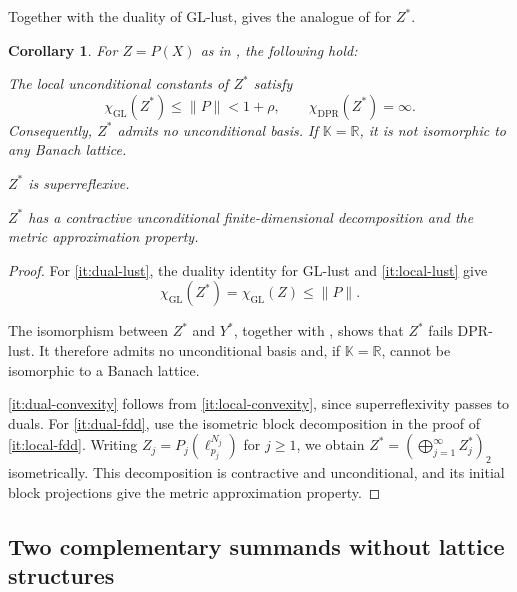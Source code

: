 \documentclass[11pt,a4paper,reqno]{amsart}
\newtheorem{corollary}[corollary]{Corollary}
\theoremstyle{definition}
\newcommand{\R}{\mathbb R}
\newcommand{\norm}[1]{\lVert #1\rVert}
\numberwithin{equation}{section}
\begin{document}
Together with the duality of GL-lust,  gives the analogue of  for $Z^*$.

\begin{corollary}\label{cor:dual-consequences}
For $Z=P(X)$ as in , the following hold:
\begin{resultparts}
\item\label{it:dual-lust}
The local unconditional constants of $Z^*$ satisfy
\begin{equation*}
 \chi_{\mathrm{GL}}(Z^*)\leq\norm P<1+\rho,
 \qquad \chi_{\mathrm{DPR}}(Z^*)=\infty.
\end{equation*}
Consequently, $Z^*$ admits no unconditional basis. If $\mathbb K=\R$, it is not isomorphic to any Banach lattice.
\item\label{it:dual-convexity}
$Z^*$ is superreflexive.
\item\label{it:dual-fdd}
$Z^*$ has a contractive unconditional finite-dimensional decomposition and the metric approximation property.
\end{resultparts}
\end{corollary}

\begin{proof}
For \ref{it:dual-lust}, the duality identity for GL-lust \cite[Remark~1.1]{Pisier1978} and \ref{it:local-lust} give
\begin{equation*}
 \chi_{\mathrm{GL}}(Z^*)=\chi_{\mathrm{GL}}(Z)\leq\norm P.
\end{equation*}

The isomorphism between $Z^*$ and $Y^*$, together with , shows that $Z^*$ fails DPR-lust. It therefore admits no unconditional basis and, if $\mathbb K=\R$, cannot be isomorphic to a Banach lattice.

\ref{it:dual-convexity} follows from \ref{it:local-convexity}, since superreflexivity passes to duals. For \ref{it:dual-fdd}, use the isometric block decomposition in the proof of \ref{it:local-fdd}. Writing $Z_j=P_j(\ell_{p_j}^{N_j})$ for $j\geq1$, we obtain $Z^*=(\bigoplus_{j=1}^{\infty}Z_j^*)_2$ isometrically. This decomposition is contractive and unconditional, and its initial block projections give the metric approximation property.
\end{proof}

\subsection{Two complementary summands without lattice structures}
\label{subsec:two-complementary-ranges}
\end{document}
